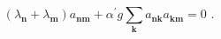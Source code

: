 \begin{equation}
(\lambda _{\mathbf{n}}+\lambda _{\mathbf{m}})a_{\mathbf{nm}}+{\alpha
^{\prime }}g\sum_{\mathbf{k}}a_{\mathbf{nk}}a_{\mathbf{km}}=0\,\,.
\end{equation}%
